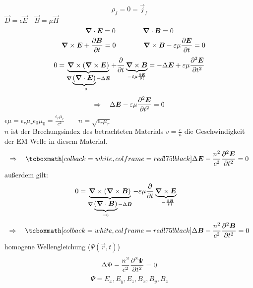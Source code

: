 \begin{equation*}
\rho_f = 0 = \vec{j}_f
\end{equation*}
$ \vec{D} = \epsilon \vec{E} \quad \vec{B} = \mu \vec{H} $
\begin{equation*}
\bm{\nabla} \cdot \bm{E} = 0 \qquad \qquad \bm{\nabla} \cdot \bm{B} = 0
\end{equation*}
\begin{equation*}
\quad \, \bm{\nabla} \times \bm{E} + \frac{\partial \bm{B}}{\partial t} = 0 \qquad \qquad \bm{\nabla} \times \bm{B} - \varepsilon \mu \frac{\partial \bm{E}}{\partial t} = 0
\end{equation*}
\begin{equation*}
0 = \underbrace{\bm{\nabla} \times \left(\bm{\nabla} \times \bm{E}\right)}_{\bm{\nabla}\underbrace{(\bm{\nabla} \cdot \bm{E})}_{= 0} - \Delta \bm{E}} + \frac{\partial }{\partial t} \underbrace{\bm{\nabla} \times \bm{B}}_{= \varepsilon \mu \frac{\partial \bm{E}}{\partial t}} = - \Delta \bm{E} + \varepsilon \mu \frac{\partial ^2 \bm{E}}{\partial t^2}
\end{equation*}
\begin{equation*}
\Rightarrow \quad \Delta \bm{E} - \varepsilon \mu \frac{\partial ^2 \bm{E}}{\partial t^2} = 0
\end{equation*}
$ \epsilon \mu = \epsilon_r \mu_r \epsilon_0 \mu_0 = \frac{\epsilon_r \mu_r}{c^2} \qquad n = \sqrt{\epsilon_r \mu_r} $\\[5pt]
$ n $ ist der Brechungsindex des betrachteten Materials $ v = \frac{c}{n} $ die Geschwindigkeit der EM-Welle in diesem Material.
\begin{equation*}
\Rightarrow \quad \rmbox{\Delta \vec{E} - \frac{n^2}{c^2} \prt{^2 \vec{E}}{t^2} = 0}
\end{equation*}
außerdem gilt:
\begin{align*}
0 &= \underbrace{\bm{\nabla} \times (\bm{\nabla} \times \bm{B})}_{\bm{\nabla} \underbrace{(\bm{\nabla} \cdot \bm{B})}_{= 0} - \Delta \bm{B}} - \varepsilon \mu \frac{\partial }{\partial t} \underbrace{\bm{\nabla} \times \bm{E}}_{= - \frac{\partial \bm{B}}{\partial t}}
\end{align*}
\begin{equation*}
\Rightarrow \quad \rmbox{\Delta \vec{B} - \frac{n^2}{c^2} \prt{^2 \vec{B}}{t^2} = 0}
\end{equation*}
homogene Wellengleichung ($ \Psi(\vec{r},t) $)
\begin{equation*}
\Delta \Psi - \frac{n^2}{c^2} \frac{\partial ^2 \Psi}{\partial t^2} = 0
\end{equation*}
\begin{equation*}
\Psi = E_x, E_y, E_z, B_x, B_y, B_z
\end{equation*}


